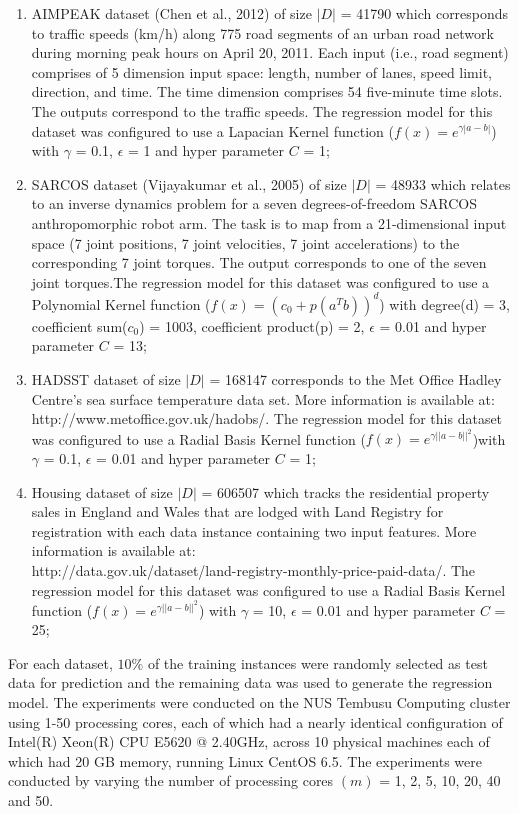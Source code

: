\documentclass[12pt]{article}
\begin{document}
\begin{enumerate}[label=(\alph*)]
\item AIMPEAK dataset  (Chen et al., 2012) of size $|D|$ = 41790 which corresponds to traffic speeds (km/h) along 775 road segments of an urban road network during morning peak hours on April 20, 2011. Each input (i.e., road segment) comprises of 5 dimension input space: length, number of lanes, speed limit, direction, and time. The time dimension comprises 54 five-minute time slots. The outputs correspond to the traffic speeds. The regression model for this dataset was configured to use a Lapacian Kernel function ($f(x) = e^{\gamma |a - b|}$) with $\gamma$ = 0.1, $\epsilon$ = 1 and hyper parameter $C$ = 1;
\item SARCOS dataset (Vijayakumar et al., 2005) of size $|D|$ = 48933 which relates to an inverse dynamics problem for a seven degrees-of-freedom SARCOS anthropomorphic robot arm. The task is to map from a 21-dimensional input space (7 joint positions, 7 joint velocities, 7 joint accelerations) to the corresponding 7 joint torques. The output corresponds to one of the seven joint torques.The regression model for this dataset was configured to use a Polynomial Kernel function ($f(x) = (c_{0} + p(a^Tb))^d $) with degree(d) = 3, coefficient sum($c_{0}$) = 1003, coefficient product(p) = 2, $\epsilon$ = 0.01 and hyper parameter $C$ = 13;
\item HADSST dataset of size $|D|$ = 168147 corresponds to the Met Office Hadley Centre's sea surface temperature data set. More information is available at:\\ http://www.metoffice.gov.uk/hadobs/. The regression model for this dataset was configured to use a Radial Basis Kernel function ($f(x) = e^{\gamma ||a - b||^2}$)with $\gamma$ = 0.1, $\epsilon$ = 0.01 and hyper parameter $C$ = 1;
\item Housing dataset of size $|D|$ = 606507 which tracks the residential property sales in England and Wales that are lodged with Land Registry for registration with each data instance containing two input features. More information is available at:\\ http://data.gov.uk/dataset/land-registry-monthly-price-paid-data/. The regression model for this dataset was configured to use a Radial Basis Kernel function ($f(x) = e^{\gamma ||a - b||^2}$) with $\gamma$ = 10, $\epsilon$ = 0.01 and hyper parameter $C$ = 25;
\end{enumerate}
For each dataset, $10\%$ of the training instances were randomly selected as test data for prediction and the remaining data was used to generate the regression model.
\newline\newline
The experiments were conducted on the NUS Tembusu Computing cluster using 1-50 processing cores, each of which had a nearly identical configuration of Intel(R) Xeon(R) CPU E5620 @ 2.40GHz, across 10 physical machines each of which had 20 GB memory, running Linux CentOS 6.5. The experiments were conducted by varying the number of processing cores $(m)$ = 1, 2, 5, 10, 20, 40 and 50.
\end{document}
